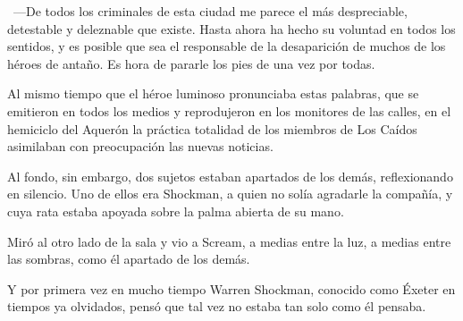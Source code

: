 ~---De todos los criminales de esta ciudad me parece el más despreciable, detestable y deleznable que existe. Hasta ahora ha hecho su voluntad en todos los sentidos, y es posible que sea el responsable de la desaparición de muchos de los héroes de antaño. Es hora de pararle los pies de una vez por todas.

Al mismo tiempo que el héroe luminoso pronunciaba estas palabras, que se emitieron en todos los medios y reprodujeron en los monitores de las calles, en el hemiciclo del Aquerón la práctica totalidad de los miembros de Los Caídos asimilaban con preocupación las nuevas noticias.

Al fondo, sin embargo, dos sujetos estaban apartados de los demás, reflexionando en silencio. Uno de ellos era Shockman, a quien no solía agradarle la compañía, y cuya rata estaba apoyada sobre la palma abierta de su mano.

Miró al otro lado de la sala y vio a Scream, a medias entre la luz, a medias entre las sombras, como él apartado de los demás.

Y por primera vez en mucho tiempo Warren Shockman, conocido como Éxeter en tiempos ya olvidados, pensó que tal vez no estaba tan solo como él pensaba.

\endinput
